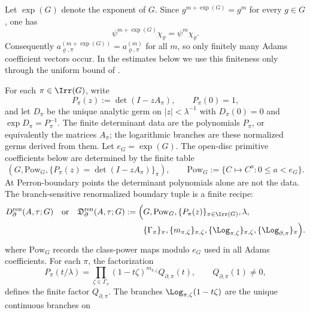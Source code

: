\begin{remark}
  \label{rem:adams-coefficients-periodic}
  Let \(\exp(G)\) denote the exponent of \(G\). Since
  \(g^{m+\exp(G)}=g^m\) for every \(g\in G\), one has
  \[
    \psi^{m+\exp(G)}\chi_\varrho=\psi^m\chi_\varrho.
  \]
  Consequently
  \(a_{\varrho,\pi}^{(m+\exp(G))}=a_{\varrho,\pi}^{(m)}\) for all
  \(m\), so only finitely many Adams coefficient vectors occur. In the
  estimates below we use this finiteness only through the uniform bound
  of .
\end{remark}

\begin{corollary}
  \label{cor:primitive-peter-weyl-determinant}
  For each \(\pi\in\Irr(G)\), write
  \[
    P_\pi(z):=\det(I-zA_\pi),\qquad P_\pi(0)=1,
  \]
  and let \(D_\pi\) be the unique analytic germ on
  \(|z|<\lambda^{-1}\) with \(D_\pi(0)=0\) and
  \(\exp D_\pi=P_\pi^{-1}\). The finite determinant data are the
  polynomials \(P_\pi\), or equivalently the matrices \(A_\pi\); the
  logarithmic branches are these normalized germs derived from them.
  Let \(e_G=\exp(G)\).  The open-disc primitive coefficients below are
  determined by the finite table
  \[
    (G,\mathrm{Pow}_G,\{P_\pi(z)=\det(I-zA_\pi)\}_\pi),
    \qquad
    \mathrm{Pow}_G:=\{C\mapsto C^a:0\le a<e_G\}.
  \]
  At Perron-boundary points the determinant polynomials alone are not the
  data.  The branch-sensitive renormalized boundary tuple is a finite recipe:
  \begin{equation}\label{eq:perron-boundary-data-tuple}
    \begin{aligned}
    D_{\partial}^{\mathrm{ren}}(A,\tau;G)
    \quad\text{or}\quad
    \mathfrak D_{\partial}^{\mathrm{ren}}(A,\tau;G)
    :=
    \Bigl(&G,\mathrm{Pow}_G,\{P_\pi(z)\}_{\pi\in\Irr(G)},\lambda,\\
      &\{\Gamma_\pi\}_\pi,\{m_{\pi,\zeta}\}_{\pi,\zeta},
        \{\Log_{\pi,\zeta}\}_{\pi,\zeta},
        \{\Log_{\partial,\pi}\}_{\pi}\Bigr).
    \end{aligned}
  \end{equation}
  where \(\mathrm{Pow}_G\) records the class-power maps modulo \(e_G\) used in
  all Adams coefficients.  For each \(\pi\), the factorization
  \[
    P_\pi(t/\lambda)=
    \prod_{\zeta\in\Gamma_\pi}(1-t\zeta)^{m_{\pi,\zeta}}
      Q_{\partial,\pi}(t),
    \qquad Q_{\partial,\pi}(1)\ne0,
  \]
  defines the finite factor \(Q_{\partial,\pi}\).  The branches
  \(\Log_{\pi,\zeta}(1-t\zeta)\) are the unique continuous branches on

\end{corollary}
